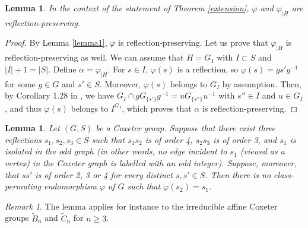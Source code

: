 \documentclass[a4paper, 11pt]{amsart}
\newtheorem{lemme}[te]{Lemma}
\theoremstyle{definition}
\theoremstyle{remark}
\newtheorem{rk}[te]{Remark}
\renewcommand{\geq}{\geqslant}
\begin{document}
\begin{lemme}\label{RP}
In the context of the statement of Theorem \ref{extension}, $\varphi$ and $\varphi_{\vert H}$ are reflection-preserving.
\end{lemme}

\begin{proof}
By Lemma \ref{lemma1}, $\varphi$ is reflection-preserving. Let us prove that $\varphi_{\vert H}$ is reflection-preserving as well. We can assume that $H=G_I$ with $I\subset S$ and $\vert I\vert +1=\vert S\vert$. Define $\alpha=\varphi_{\vert H}$. For $s\in I$, $\varphi(s)$ is a reflection, so $\varphi(s)=gs'g^{-1}$ for some $g\in G$ and $s'\in S$. Moreover, $\varphi(s)$ belongs to $G_I$ by assumption. Then, by Corollary 1.28 in \cite{franz}, we have $G_I\cap gG_{\lbrace s'\rbrace}g^{-1}=uG_{\lbrace s''\rbrace} u^{-1}$ with $s''\in I$ and $u\in G_I$, and thus $\varphi(s)$ belongs to $I^{G_I}$, which proves that $\alpha$ is reflection-preserving.    
\end{proof}

\begin{lemme}\label{order4}
Let $(G,S)$ be a Coxeter group. Suppose that there exist three reflections $s_1,s_2,s_3\in S$ such that $s_1s_2$ is of order 4, $s_2s_3$ is of order 3, and $s_1$ is isolated in the odd graph (in other words, no edge incident to $s_1$ (viewed as a vertex) in the Coxeter graph is labelled with an odd integer). Suppose, moreover, that $ss'$ is of order 2, 3 or 4 for every distinct $s,s'\in S$. Then there is no class-permuting endomorphism $\varphi$ of $G$ such that $\varphi(s_2)=s_1$.
\end{lemme}

\begin{rk}
The lemma applies for instance to the irreducible affine Coxeter groups $\tilde{B}_n$ and $\tilde{C}_n$ for $n\geq 3$.  
\end{rk}
\end{document}
